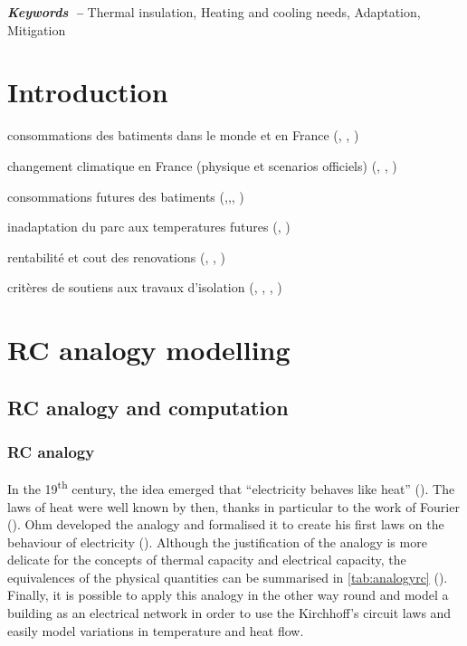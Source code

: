 \documentclass[11pt]{article}
\providecommand{\keywords}[1]
{
  \small    
  \textbf{\textit{Keywords~--}} #1
}
\begin{document}
\keywords{Thermal insulation, Heating and cooling needs, Adaptation, Mitigation}

\clearpage
\tableofcontents

\clearpage

\section{Introduction}
\label{sec:intro}

consommations des batiments dans le monde et en France (\cite{unep_2023_2024}, \cite{sdes_chiffres_2023}, \cite{sdes_consommation_2023})

changement climatique en France (physique et scenarios officiels) (\cite{ipcc_climate_2021}, \cite{ouzeau_heat_2016}, \cite{ministere_de_la_transition_ecologique_trajectoire_2023})

consommations futures des batiments (\cite{larsen_climate_2020},\cite{moreau_evaluation_2023},\cite{filahi_projections_2024}, \cite{tao_uncertainty_2024})

inadaptation du parc aux temperatures futures (\cite{cour_des_comptes_laction_2024}, \cite{i4ce_vagues_2024})

rentabilité et cout des renovations (\cite{ademe_renovation_2019}, \cite{i4ce_trajectoires_2023}, \cite{giraudet_analyse_2024})

critères de soutiens aux travaux d'isolation (\cite{france_strategie_dispositif_2024}, \cite{coulaud_maprimerenov_2024}, \cite{anah_aides_2024-1}, \cite{dagostino_impact_2024})


\clearpage
\section{RC analogy modelling}
\label{sec:rc}

    \subsection{RC analogy and computation} %
    \label{sub:rc_analogy_and_computation}

        \subsubsection{RC analogy} %
        \label{ssub:rc_analogy}

        In the 19\textsuperscript{th} century, the idea emerged that \enquote{electricity behaves like heat} (\cite{bolmont_evolution_2003}). The laws of heat were well known by then, thanks in particular to the work of Fourier (\cite{fourier_theorie_1822}). Ohm developed the analogy and formalised it to create his first laws on the behaviour of electricity (\cite{ohm_galvanische_1827}). Although the justification of the analogy is more delicate for the concepts of thermal capacity and electrical capacity, the equivalences of the physical quantities can be summarised in \ref{tab:analogyrc} (\cite{bolmont_evolution_2003}). Finally, it is possible to apply this analogy in the other way round and model a building as an electrical network in order to use the Kirchhoff's circuit laws and easily model variations in temperature and heat flow. \\
\end{document}
